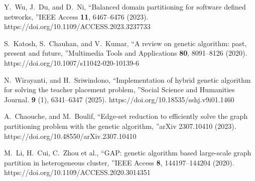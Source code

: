 \documentclass[
11pt,%
tightenlines,%
twoside,%
onecolumn,%
nofloats,%
nobibnotes,%
nofootinbib,%
superscriptaddress,%
noshowpacs,%
centertags]%
{revtex4}
\begin{document}
\begin{thebibliography}{99}
Y.~Wu, J.~Du, and D.~Ni, \textquotedblleft Balanced domain partitioning for software defined networks, \textquotedblright IEEE Access \textbf{11}, 6467--6476 (2023). https://doi.org/10.1109/ACCESS.2023.3237733

S.~Katosh, S.~Chauhan, and V.~Kumar, \textquotedblleft A review on genetic algorithm: past, present and future, \textquotedblright Multimedia Tools and Applications \textbf{80}, 8091--8126 (2020). https://doi.org/10.1007/s11042-020-10139-6

N.~Wirayanti, and H.~Sriwindono, \textquotedblleft Implementation of hybrid genetic algorithm for solving the teacher placement problem, \textquotedblright Social Science and Humanities Journal. \textbf{9} (1), 6341--6347 (2025). https://doi.org/10.18535/sshj.v9i01.1460

A.~Chaouche, and M.~Boulif, \textquotedblleft Edge-set reduction to efficiently solve the graph partitioning problem with the genetic algorithm, \textquotedblright arXiv 2307.10410 (2023). https://doi.org/10.48550/arXiv.2307.10410

M.~Li, H.~Cui, C.~Zhou et al., \textquotedblleft GAP: genetic algorithm based large-scale graph partition in heterogeneous cluster, \textquotedblright IEEE Access \textbf{8}, 144197--144204 (2020). https://doi.org/10.1109/ACCESS.2020.3014351

\end{thebibliography}
\end{document}
